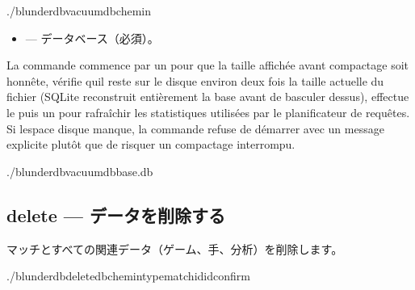 \documentclass[letterpaper,10pt,dvipdfmx]{sphinxmanual}
\begin{document}
\begin{sphinxVerbatim}[commandchars=\\\{\}]
./blunderdbvacuum\PYGZhy{}\PYGZhy{}db\PYGZlt{}chemin\PYGZgt{}
\end{sphinxVerbatim}

\sphinxAtStartPar
{}
\begin{itemize}
\item {} 
\sphinxAtStartPar
{} — データベース（必須）。

\end{itemize}

\sphinxAtStartPar
La commande commence par un  pour que la taille
affichée avant compactage soit honnête, vérifie qu\textquotesingle{}il reste sur le disque
environ deux fois la taille actuelle du fichier (SQLite reconstruit
entièrement la base avant de basculer dessus), effectue le  puis un
 pour rafraîchir les statistiques utilisées par le planificateur de
requêtes. Si l\textquotesingle{}espace disque manque, la commande refuse de démarrer avec un
message explicite plutôt que de risquer un compactage interrompu.

\sphinxAtStartPar
{}

\begin{sphinxVerbatim}[commandchars=\\\{\}]
./blunderdbvacuum\PYGZhy{}\PYGZhy{}dbbase.db

\end{sphinxVerbatim}


\subsection{delete — データを削除する}
\label{\detokenize{cli:delete-supprimer-des-donnees}}
\sphinxAtStartPar
マッチとすべての関連データ（ゲーム、手、分析）を削除します。

\begin{sphinxVerbatim}[commandchars=\\\{\}]
./blunderdbdelete\PYGZhy{}\PYGZhy{}db\PYGZlt{}chemin\PYGZgt{}\PYGZhy{}\PYGZhy{}typematch\PYGZhy{}\PYGZhy{}id\PYGZlt{}id\PYGZgt{}\PYG{o}{[}\PYGZhy{}\PYGZhy{}confirm\PYG{o}{]}
\end{sphinxVerbatim}
\end{document}
